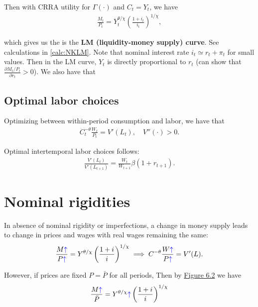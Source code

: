 \documentclass[../main.tex]{subfiles}
\begin{document}
        Then with CRRA utility for $\Gamma(\cdot)$ and $C_t = Y_t$, we have
        \begin{align}
            \frac{M_t}{P_t} = Y_t^{\theta/\chi} \left(\frac{1+i_t}{i_t}\right)^{1/\chi},
            \label{eqn:NKLM}
        \end{align}
        
        which gives us the is the \textbf{LM (liquidity-money supply) curve}. See calculations in \eqref{calc:NKLM}. Note that nominal interest rate $i_t \simeq r_t + \pi_t$ for small values. Then in the LM curve, $Y_t$ is directly proportional to $r_t$ (can show that $\frac{\partial M_t/P_t}{\partial r_t} > 0$). We also have that
        
    \subsection{Optimal labor choices}
        Optimizing between within-period consumption and labor, we have that
        \begin{align}
            C_t^{-\theta}\frac{W_t}{P_t} = V'(L_t),
            \quad V''(\cdot) > 0.
            \label{eqn:NKCL}
        \end{align}
        
        Optimal intertemporal labor choices follows:
        \begin{align}
            \frac{V'(L_t)}{V'(L_{t+1})}
            =
            \frac{W_t}{ W_{t+1}}\beta(1+r_{t+1}).
            \label{eqn:ng-labor-euler}
        \end{align}
    
    \section{Nominal rigidities}
        
        In absence of nominal rigidity or imperfections, a change in money supply leads to change in prices and wages with real wages remaining the same:
        \newcommand{\up}{\textcolor{blue}{\uparrow}}
        \newcommand{\down}{\textcolor{red}{\downarrow}}
        \begin{align}
            \frac{M \up}{P \up} = Y^{\theta/\chi} \left(\frac{1+i}{i}\right)^{1/\chi}
            \implies
            C^{-\theta}\frac{W \up}{P \up} = V'(L).
        \end{align}
        
        However, if prices are fixed $P = \bar P$ for all periods, Then by \hyperref[fig:6.2]{Figure 6.2} we have
        \begin{align}
            \frac{M \up}{\bar P} = Y^{\theta/\chi} \up \left(\frac{1+i}{i}\right)^{1/\chi}
        \end{align}
        
\end{document}
